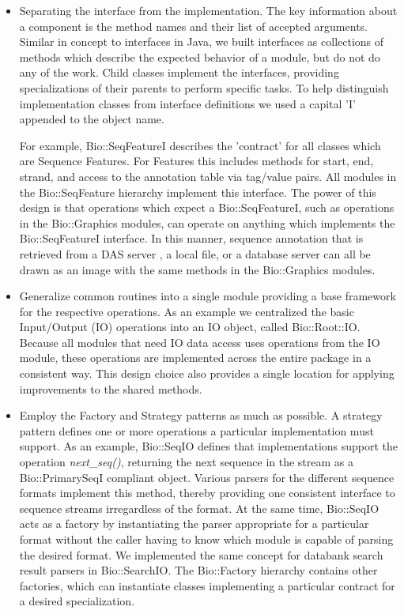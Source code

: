 \documentclass[12pt]{article}
\begin{document}
\begin{itemize}

\item Separating the interface from the implementation.  The key
information about a component is the method names and their list
of accepted arguments.  Similar in concept to interfaces in Java, we
built interfaces as collections of methods which describe the expected
behavior of a module, but do not do any of the work.  Child classes
implement the interfaces, providing specializations of their parents
to perform specific tasks.  To help distinguish implementation classes from
interface definitions we used a capital 'I' appended to the object
name.

For example, Bio::SeqFeatureI describes the 'contract' for all classes
which are Sequence Features.  For Features this includes methods for
start, end, strand, and access to the annotation table via tag/value
pairs.  All modules in the Bio::SeqFeature hierarchy implement this
interface.  The power of this design is that operations which expect a
Bio::SeqFeatureI, such as operations in the Bio::Graphics modules, can
operate on anything which implements the Bio::SeqFeatureI interface.
In this manner, sequence annotation that is retrieved from a DAS
server \cite{das}, a local file, or a database server can all be drawn
as an image with the same methods in the Bio::Graphics modules.

\item Generalize common routines into a single module providing a base
framework for the respective operations.  As an example we centralized
the basic Input/Output (IO) operations into an IO object, called
Bio::Root::IO.  Because all modules that need IO data access uses
operations from the IO module, these operations are implemented across
the entire package in a consistent way.  This design choice also
provides a single location for applying improvements to the shared
methods.

\item Employ the Factory and Strategy patterns \cite{gangoffour} as
much as possible. A strategy pattern defines one or more operations a
particular implementation must support. As an example, Bio::SeqIO
defines that implementations support the operation
\textit{next\_seq()}, returning the next sequence in the stream as a
Bio::PrimarySeqI compliant object. Various parsers for the different
sequence formats implement this method, thereby providing one
consistent interface to sequence streams irregardless of the
format. At the same time, Bio::SeqIO acts as a factory by
instantiating the parser appropriate for a particular format without
the caller having to know which module is capable of parsing the
desired format. We implemented the same concept for databank search
result parsers in Bio::SearchIO. The Bio::Factory hierarchy contains
other factories, which can instantiate classes implementing a
particular contract for a desired specialization.

\end{itemize}
\end{document}
